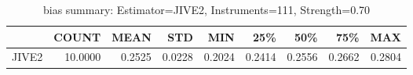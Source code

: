 \begin{table}[ht]
\centering
\caption{bias summary: Estimator=JIVE2, Instruments=111, Strength=0.70}
\begin{tabular}{lrrrrrrrr}
\toprule
 & COUNT & MEAN & STD & MIN & 25\% & 50\% & 75\% & MAX \\
\midrule
JIVE2 & 10.0000 & 0.2525 & 0.0228 & 0.2024 & 0.2414 & 0.2556 & 0.2662 & 0.2804 \\
\bottomrule
\end{tabular}
\end{table}
